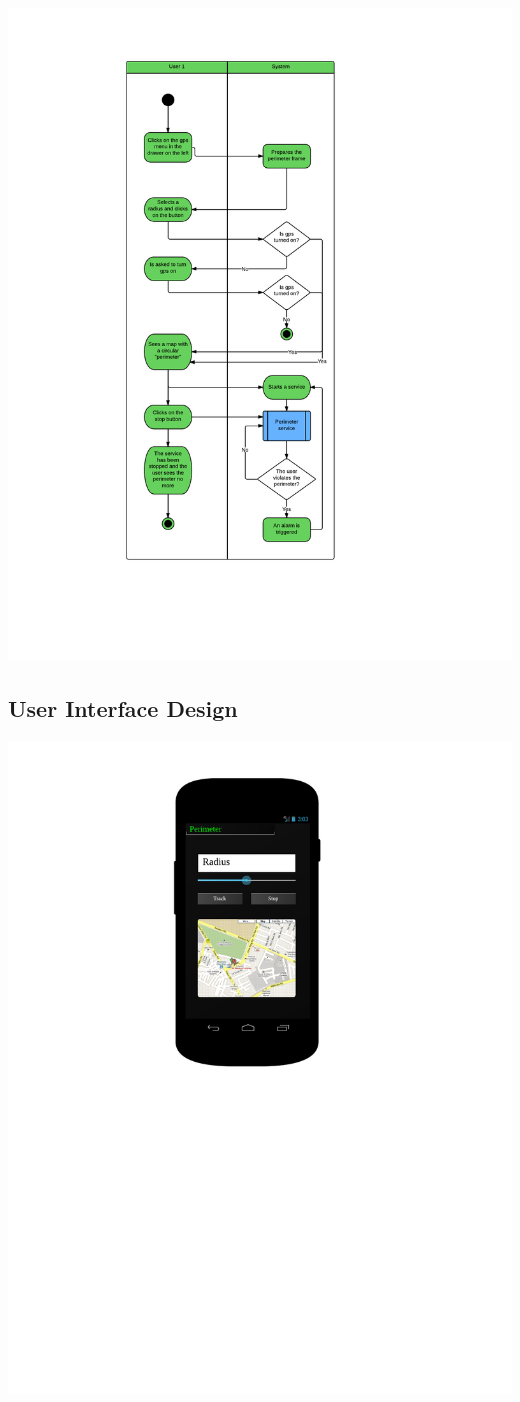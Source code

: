 \includegraphics[scale=0.7]{images/Perimeter}

\newpage
\subsection{User Interface Design}

\includegraphics[scale=0.7]{images/Perimeter_mobile}
